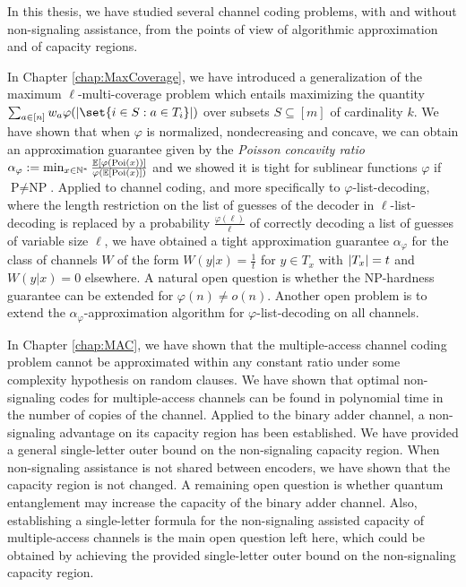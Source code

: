 In this thesis, we have studied several channel coding problems, with and without non-signaling assistance, from the points of view of algorithmic approximation and of capacity regions.

In Chapter \ref{chap:MaxCoverage}, we have introduced a generalization of the maximum $\ell$-multi-coverage problem which entails maximizing the quantity $\sum_{a \in [n]}  w_a\varphi(\abs{\set{i \in S : a \in T_i}})$ over subsets $S \subseteq [m]$ of cardinality $k$. We have shown that when $\varphi$ is normalized, nondecreasing and concave, we can obtain an approximation guarantee given by the \emph{Poisson concavity ratio} $\alpha_{\varphi} := \min_{x \in \mathbb{N}^*} \frac{\mathbb{E}[\varphi(\operatorname{\text{Poi}}(x))]}{\varphi(\mathbb{E}[\operatorname{\text{Poi}}(x)])}$ and we showed it is tight for sublinear functions $\varphi$ if $\textrm{P}\not=\textrm{NP}$. Applied to channel coding, and more specifically to $\varphi$-list-decoding, where the length restriction on the list of guesses of the decoder in $\ell$-list-decoding is replaced by a probability $\frac{\varphi(\ell)}{\ell}$ of correctly decoding a list of guesses of variable size $\ell$, we have obtained a tight approximation guarantee $\alpha_{\varphi}$ for the class of channels $W$ of the form $W(y|x) = \frac{1}{t}$ for $y \in T_x$ with $\abs{T_x}=t$ and $W(y|x) = 0$ elsewhere. A natural open question is whether the \textrm{NP}-hardness guarantee can be extended for $\varphi(n) \not= o(n)$. Another open problem is to extend the $\alpha_{\varphi}$-approximation algorithm for $\varphi$-list-decoding on all channels.

In Chapter \ref{chap:MAC}, we have shown that the multiple-access channel coding problem cannot be approximated within any constant ratio under some complexity hypothesis on random clauses. We have shown that optimal non-signaling codes for multiple-access channels can be found in polynomial time in the number of copies of the channel. Applied to the binary adder channel, a non-signaling advantage on its capacity region has been established. We have provided a general single-letter outer bound on the non-signaling capacity region. When non-signaling assistance is not shared between encoders, we have shown that the capacity region is not changed. A remaining open question is whether quantum entanglement may increase the capacity of the binary adder channel. Also, establishing a single-letter formula for the non-signaling assisted capacity of multiple-access channels is the main open question left here, which could be obtained by achieving the provided single-letter outer bound on the non-signaling capacity region.

